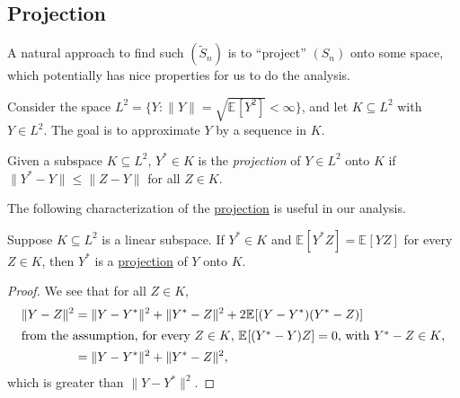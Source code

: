 \subsection{Projection}

\begin{intuition}
	A natural approach to find such \((\widetilde{S} _n)\) is to ``project'' \((S_n)\) onto some space, which potentially has nice properties for us to do the analysis.
\end{intuition}

Consider the space \(L^2 = \{ Y \colon \lVert Y \rVert = \sqrt{\mathbb{E}_{}[Y^2] } < \infty \} \), and let \(K \subseteq L^2\) with \(Y \in L^2\). The goal is to approximate \(Y\) by a sequence in \(K\).

\begin{definition}[Projection]\label{def:projection}
	Given a subspace \(K \subseteq L^2\), \(Y^{\ast} \in K\) is the \emph{projection} of \(Y \in L^2\) onto \(K\) if \(\lVert Y^{\ast} - Y \rVert \leq \lVert Z - Y \rVert \) for all \(Z \in K\).
\end{definition}

The following characterization of the \hyperref[def:projection]{projection} is useful in our analysis.

\begin{proposition}\label{prop:projection}
	Suppose \(K \subseteq L^2\) is a linear subspace. If \(Y^{\ast} \in K\) and \(\mathbb{E}_{}[Y^{\ast} Z] = \mathbb{E}_{}[Y Z] \) for every \(Z \in K\), then \(Y^{\ast} \) is a \hyperref[def:projection]{projection} of \(Y\) onto \(K\).
\end{proposition}
\begin{proof}
	We see that for all \(Z \in K\),
	\begin{align*}
		\lVert Y - Z \rVert ^2
		 & = \lVert Y - Y^{\ast}  \rVert ^2 + \lVert Y^{\ast} - Z \rVert ^2 + 2 \mathbb{E}_{}[(Y-Y^{\ast} ) (Y^{\ast} - Z)] \\
		\shortintertext{from the assumption, for every \(Z \in K\), \(\mathbb{E}_{}[(Y^{\ast} - Y) Z] = 0 \), with \(Y^{\ast} - Z \in K\),}
		 & = \lVert Y - Y^{\ast}  \rVert ^2 + \lVert Y^{\ast} - Z \rVert ^2,
	\end{align*}
	which is greater than \(\lVert Y - Y^{\ast} \rVert ^2\).
\end{proof}

